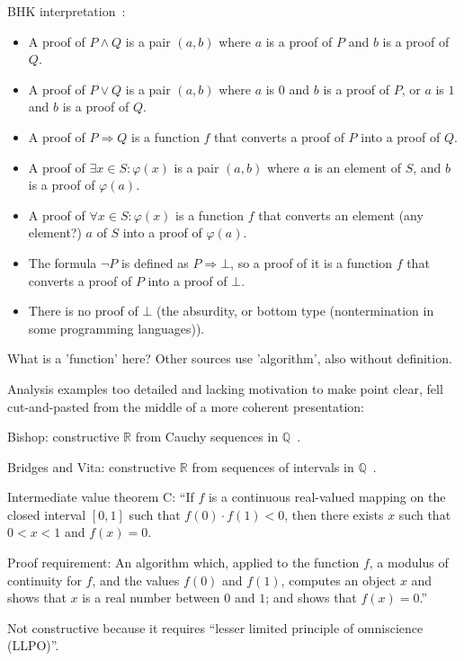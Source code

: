 BHK interpretation~\cite{wiki:Brouwer_Heyting_Kolmogorov_interpretation}:
\begin{itemize}
  \item A proof of $P\wedge Q$ 
  is a pair $(a,b)$ where $a$ is a proof of $P$ 
  and $b$ is a proof of $Q$.
\item A proof of $P\vee Q$ is a pair $(a,b)$ 
where $a$ is $0$ and 
$b$ is a proof of $P$, 
or $a$ is $1$ 
and $b$ is a proof of $Q$.
\item A proof of $P\Rightarrow Q$ is 
a function $f$ that converts 
a proof of $P$ into a proof of $Q$.
\item A proof of $\exists x\in S:\varphi (x)$ is 
a pair $(a,b)$ where 
$a$ is an element of $S$, 
and $b$ is a proof of $\varphi (a)$.
\item A proof of $\forall x\in S:\varphi (x)$ is 
a function $f$ that converts 
an element (any element?) $a$ of $S$ into a proof of $\varphi (a)$.
\item The formula $\neg P$ is defined as $P\Rightarrow \bot$, 
so a proof of it is a function $f$ that converts 
a proof of $P$ into a proof of $\bot$.
\item There is no proof of $\bot$
(the absurdity, or bottom type 
(nontermination in some programming languages)).
\end{itemize}
What is a 'function' here? 
Other sources use 'algorithm', also without definition.

Analysis examples too detailed and lacking motivation 
to make point clear, fell cut-and-pasted from the middle
of a more coherent presentation:

Bishop: constructive $\mathbb{R}$ 
from Cauchy sequences 
in $\mathbb{Q}$~\cite{bishop1985constructive}.

Bridges and Vita: constructive $\mathbb{R}$ from sequences
of intervals in $\mathbb{Q}$~\cite{Bridger:2019}.

Intermediate value theorem C: 
``If $f$ is a continuous real-valued mapping 
on the closed interval $[0,1]$ such that $f(0)⋅f(1)<0$, 
then there exists $x$ such that $0<x<1$ and $f(x)=0$.

Proof requirement: 
An algorithm which, applied to the function $f$, 
a modulus of continuity for $f$, and the values $f(0)$ and $f(1)$,
computes an object $x$ and shows that $x$ is a real number 
between $0$ and $1$; and
shows that $f(x)=0$.''~\cite{sep:mathematics_constructive}

Not constructive because it requires
``lesser limited principle of omniscience (LLPO)''.


